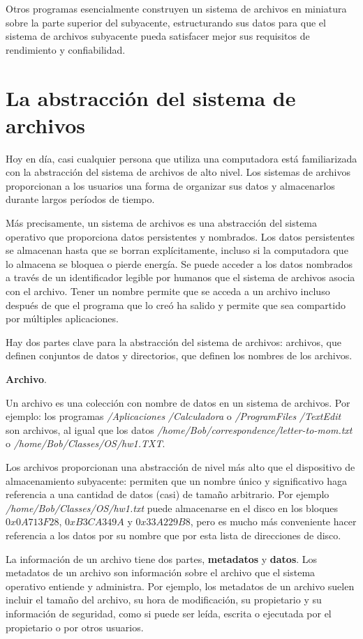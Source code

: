 \documentclass[10pt]{book}
\begin{document}
Otros programas esencialmente construyen un sistema de archivos en miniatura sobre la parte superior del subyacente, estructurando sus datos para que el sistema de archivos subyacente pueda satisfacer mejor sus requisitos de rendimiento y confiabilidad.

\section{La abstracción del sistema de archivos}
Hoy en día, casi cualquier persona que utiliza una computadora está familiarizada con la abstracción del sistema de archivos de alto nivel. Los sistemas de archivos proporcionan a los usuarios una forma de organizar sus datos y almacenarlos durante largos períodos de tiempo.

Más precisamente, un sistema de archivos es una abstracción del sistema operativo que proporciona datos persistentes y nombrados. Los datos persistentes se almacenan hasta que se borran explícitamente, incluso si la computadora que lo almacena se bloquea o pierde energía. Se puede acceder a los datos nombrados a través de un identificador legible por humanos que el sistema de archivos asocia con el archivo. Tener un nombre permite que se acceda a un archivo incluso después de que el programa que lo creó ha salido y permite que sea compartido por múltiples aplicaciones.

Hay dos partes clave para la abstracción del sistema de archivos: archivos, que definen conjuntos de datos y directorios, que definen los nombres de los archivos.

\textbf{Archivo}. 

Un archivo es una colección con nombre de datos en un sistema de archivos. Por ejemplo: los programas \textit{/Aplicaciones} \textit{/Calculadora} o \textit{/ProgramFiles} \textit{/TextEdit} son archivos, al igual que los datos \textit{/home/Bob/correspondence/letter-to-mom.txt} o \textit{/home/Bob/Classes/OS/hw1.TXT}.

Los archivos proporcionan una abstracción de nivel más alto que el dispositivo de almacenamiento subyacente: permiten que un nombre único y significativo haga referencia a una cantidad de datos (casi) de tamaño arbitrario. Por ejemplo \textit{/home/Bob/Classes/OS/hw1.txt} puede almacenarse en el disco en los bloques $0x0A713F28$, $0xB3CA349A$ y $0x33A229B8$, pero es mucho más conveniente hacer referencia a los datos por su nombre que por esta lista de direcciones de disco.

La información de un archivo tiene dos partes, \textbf{metadatos} y \textbf{datos}. Los metadatos de un archivo son información sobre el archivo que el sistema operativo entiende y administra. Por ejemplo, los metadatos de un archivo suelen incluir el tamaño del archivo, su hora de modificación, su propietario y su información de seguridad, como si puede ser leída, escrita o ejecutada por el propietario o por otros usuarios.
\end{document}
